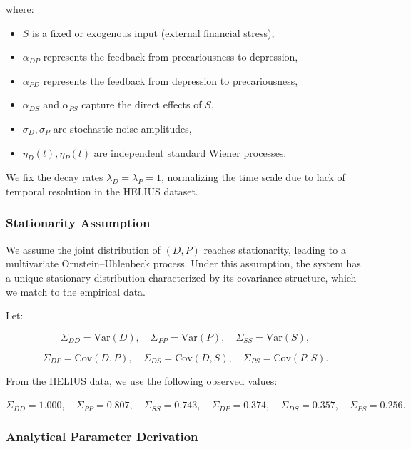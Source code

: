 \documentclass[
]{article}
\providecommand{\tightlist}{%
  \setlength{\itemsep}{0pt}\setlength{\parskip}{0pt}}\usepackage{longtable,booktabs,array}
\begin{document}
where:

\begin{itemize}
\tightlist
\item
  \(S\) is a fixed or exogenous input (external financial stress),
\item
  \(\alpha_{DP}\) represents the feedback from precariousness to
  depression,
\item
  \(\alpha_{PD}\) represents the feedback from depression to
  precariousness,
\item
  \(\alpha_{DS}\) and \(\alpha_{PS}\) capture the direct effects of
  \(S\),
\item
  \(\sigma_D, \sigma_P\) are stochastic noise amplitudes,
\item
  \(\eta_D(t), \eta_P(t)\) are independent standard Wiener processes.
\end{itemize}

We fix the decay rates \(\lambda_D = \lambda_P = 1\), normalizing the
time scale due to lack of temporal resolution in the HELIUS dataset.

\subsubsection{Stationarity Assumption}\label{stationarity-assumption}

We assume the joint distribution of \((D, P)\) reaches stationarity,
leading to a multivariate Ornstein--Uhlenbeck process. Under this
assumption, the system has a unique stationary distribution
characterized by its covariance structure, which we match to the
empirical data.

Let:

\[
\Sigma_{DD} = \mathrm{Var}(D), \quad \Sigma_{PP} = \mathrm{Var}(P), \quad \Sigma_{SS} = \mathrm{Var}(S),
\]

\[
\Sigma_{DP} = \mathrm{Cov}(D, P), \quad \Sigma_{DS} = \mathrm{Cov}(D, S), \quad \Sigma_{PS} = \mathrm{Cov}(P, S).
\]

From the HELIUS data, we use the following observed values:

\(\Sigma_{DD} = 1.000, \quad \Sigma_{PP} = 0.807, \quad \Sigma_{SS} = 0.743, \quad \Sigma_{DP} = 0.374, \quad \Sigma_{DS} = 0.357, \quad \Sigma_{PS} = 0.256.\)

\subsubsection{Analytical Parameter
Derivation}\label{analytical-parameter-derivation}
\end{document}
